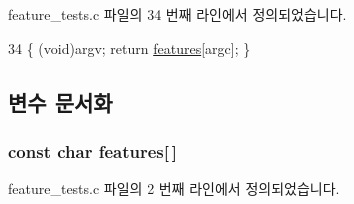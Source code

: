 feature\+\_\+tests.\+c 파일의 34 번째 라인에서 정의되었습니다.


\begin{DoxyCode}
34 \{ (void)argv; \textcolor{keywordflow}{return} \hyperlink{avdecc-lib_2_c_make_files_2feature__tests_8c_a1582568e32f689337602a16bf8a5bff0}{features}[argc]; \}
\end{DoxyCode}


\subsection{변수 문서화}
\subsubsection[{\texorpdfstring{features}{features}}]{\setlength{\rightskip}{0pt plus 5cm}const char features\mbox{[}$\,$\mbox{]}}\hypertarget{avdecc-lib_2_c_make_files_2feature__tests_8c_a1582568e32f689337602a16bf8a5bff0}{}\label{avdecc-lib_2_c_make_files_2feature__tests_8c_a1582568e32f689337602a16bf8a5bff0}


feature\+\_\+tests.\+c 파일의 2 번째 라인에서 정의되었습니다.

